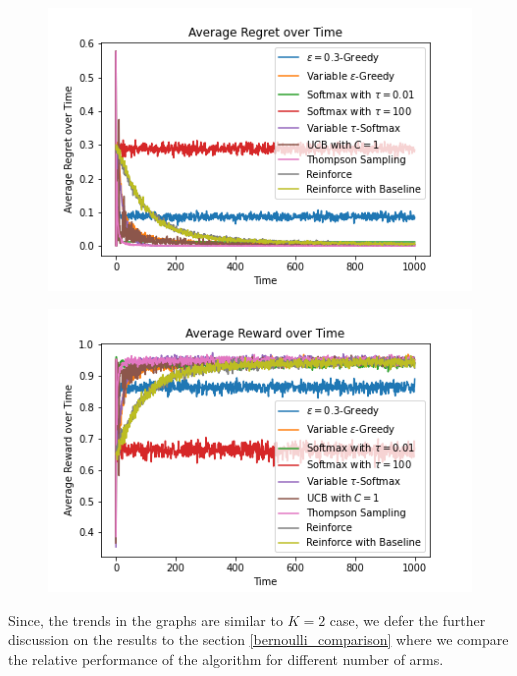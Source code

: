 \documentclass{article}
\begin{document}
			\begin{figure}[H]
			\graphicspath{ {../Experiments/Bernoulli_10_every_case/} }
			\centering
			\begin{minipage}{.5\textwidth}
			  \centering
			  \includegraphics[width=\linewidth]{Average_Regret_over_Time.png}
			  \label{fig:test1}
			\end{minipage}%
			\begin{minipage}{.5\textwidth}
			  \centering
			  \includegraphics[width=\linewidth]{Average_Reward_over_Time.png}
			  \label{fig:test2}
			\end{minipage}
			\end{figure}
		
		Since, the trends in the graphs are similar to $K=2$ case, we defer the further discussion on the results to the section \ref{bernoulli_comparison}  where we compare
		the relative performance of the algorithm for different number of arms.
			
\end{document}
